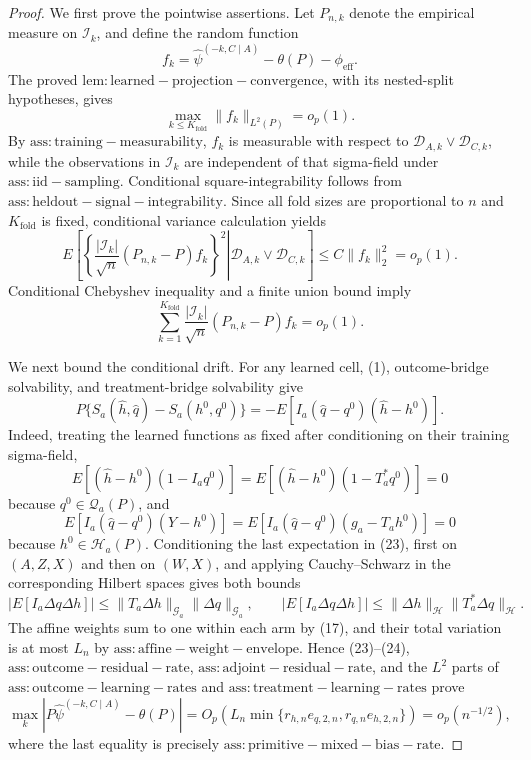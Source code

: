 \documentclass{article}
\begin{document}
\begin{proof}
We first prove the pointwise assertions.  Let \(P_{n,k}\) denote the empirical measure on \(\mathcal I_k\), and define the random function
\[
 f_k=\widehat\psi^{(-k,C\mid A)}-\theta(P)-\phi_{\mathrm{eff}}.
\]
The proved \(\mathrm{lem:learned-projection-convergence}\), with its nested-split hypotheses, gives
\[
 \max_{k\le K_{\mathrm{fold}}}\|f_k\|_{L^2(P)}=o_p(1).                   \tag{20}
\]
By \(\mathrm{ass:training-measurability}\), \(f_k\) is measurable with respect to \(\mathcal D_{A,k}\vee\mathcal D_{C,k}\), while the observations in \(\mathcal I_k\) are independent of that sigma-field under \(\mathrm{ass:iid-sampling}\).  Conditional square-integrability follows from \(\mathrm{ass:heldout-signal-integrability}\).  Since all fold sizes are proportional to \(n\) and \(K_{\mathrm{fold}}\) is fixed, conditional variance calculation yields
\[
 E\!\left[
 \left.\left\{\frac{|\mathcal I_k|}{\sqrt n}(P_{n,k}-P)f_k\right\}^2
 \right|\mathcal D_{A,k}\vee\mathcal D_{C,k}\right]
 \le C\|f_k\|_2^2=o_p(1).                                                  \tag{21}
\]
Conditional Chebyshev inequality and a finite union bound imply
\[
 \sum_{k=1}^{K_{\mathrm{fold}}}\frac{|\mathcal I_k|}{\sqrt n}
 (P_{n,k}-P)f_k=o_p(1).                                                      \tag{22}
\]

We next bound the conditional drift.  For any learned cell, (1), outcome-bridge solvability, and treatment-bridge solvability give
\[
 P\{S_a(\widehat h,\widehat q)-S_a(h^0,q^0)\}
 =-E[I_a(\widehat q-q^0)(\widehat h-h^0)].                                 \tag{23}
\]
Indeed, treating the learned functions as fixed after conditioning on their training sigma-field,
\[
 E[(\widehat h-h^0)(1-I_aq^0)]
 =E[(\widehat h-h^0)(1-T_a^*q^0)]=0
\]
because \(q^0\in\mathcal Q_a(P)\), and
\[
 E[I_a(\widehat q-q^0)(Y-h^0)]
 =E[I_a(\widehat q-q^0)(g_a-T_ah^0)]=0
\]
because \(h^0\in\mathcal H_a(P)\).  Conditioning the last expectation in (23), first on \((A,Z,X)\) and then on \((W,X)\), and applying Cauchy--Schwarz in the corresponding Hilbert spaces gives both bounds
\[
 |E[I_a\Delta q\Delta h]|
 \le\|T_a\Delta h\|_{\mathcal G_a}\|\Delta q\|_{\mathcal G_a},
 \qquad
 |E[I_a\Delta q\Delta h]|
 \le\|\Delta h\|_{\mathcal H}\|T_a^*\Delta q\|_{\mathcal H}.         \tag{24}
\]
The affine weights sum to one within each arm by (17), and their total variation is at most \(L_n\) by \(\mathrm{ass:affine-weight-envelope}\).  Hence (23)--(24), \(\mathrm{ass:outcome-residual-rate}\), \(\mathrm{ass:adjoint-residual-rate}\), and the \(L^2\) parts of \(\mathrm{ass:outcome-learning-rates}\) and \(\mathrm{ass:treatment-learning-rates}\) prove
\[
 \max_k|P\widehat\psi^{(-k,C\mid A)}-\theta(P)|
 =O_p\!\left(L_n\min\{r_{h,n}e_{q,2,n},r_{q,n}e_{h,2,n}\}\right)
 =o_p(n^{-1/2}),                                                             \tag{25}
\]
where the last equality is precisely \(\mathrm{ass:primitive-mixed-bias-rate}\).


\end{proof}
\end{document}
